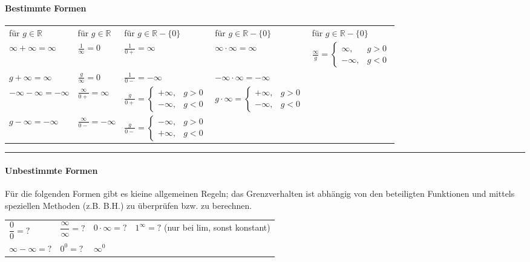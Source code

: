 \paragraph{Bestimmte Formen}
\begin{tabulary}{14cm}{LLLLL}
für $g\in \mathbb R$	&	für $g\in \mathbb R$	&	für $g\in \mathbb R-\{0\}$	&	für $g\in \mathbb R-\{0\}$	&	für $g\in \mathbb R-\{0\}$\\
$\infty+\infty=\infty$	&$\frac{1}{\infty}=0$		&	$\frac{1}{0+}=\infty$& $\infty\cdot \infty=\infty$& $\frac{\infty}{g}= \begin{cases} \infty, & g>0 \\ -\infty,& g<0 \end{cases}$ \\


$g+\infty=\infty$		&$\frac{g}{\infty}=0$		&	$\frac{1}{0-}=-\infty$& $-\infty\cdot \infty=-\infty$ &  \\
$-\infty-\infty=-\infty$&$\frac{\infty}{0+}=\infty$	& $\frac{g}{0+}= \begin{cases} +\infty, & g>0 \\ -\infty,& g<0 \end{cases}$ &
$g\cdot \infty= \begin{cases} +\infty, & g>0 \\ -\infty,& g<0 \end{cases}$ & \\

$g-\infty=-\infty$		&$\frac{\infty}{0-}=-\infty$& $\frac{g}{0-}= \begin{cases} -\infty, & g>0 \\ +\infty,& g<0 \end{cases}$ & &\\
\end{tabulary}
\hrule
\paragraph{Unbestimmte Formen}


Für die folgenden Formen gibt es kieine allgemeinen Regeln; das Grenzverhalten ist abhängig von den beteiligten Funktionen und mittels speziellen Methoden (z.B. B.H.) zu überprüfen bzw. zu berechnen.
\begin{tabular}{p{3cm}p{3cm}p{3cm}p{3cm}}
	$\dfrac{0}{0}=?$	&	$\dfrac{\infty}{\infty}=?$	&	$0\cdot \infty =?$	&	$1^{\infty}=?$ (nur bei lim, sonst konstant)\\
	$\infty-\infty=?$	&	$0^{0}=?$	&	$\infty ^{0}$	&\\
\end{tabular}

